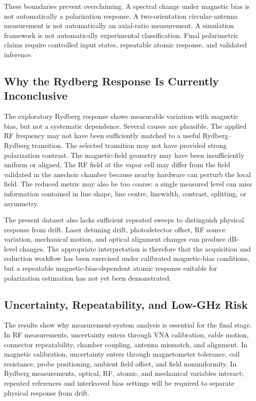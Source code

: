 \documentclass{ieeeaccess}
\begin{document}
These boundaries prevent overclaiming. A spectral change under magnetic bias is not automatically a polarization response. A two-orientation circular-antenna measurement is not automatically an axial-ratio measurement. A simulation framework is not automatically experimental classification. Final polarimetric claims require controlled input states, repeatable atomic response, and validated inference.

\subsection{Why the Rydberg Response Is Currently Inconclusive}
\label{subsec:discussion_rydberg_inconclusive}

The exploratory Rydberg response shows measurable variation with magnetic bias, but not a systematic dependence. Several causes are plausible. The applied RF frequency may not have been sufficiently matched to a useful Rydberg--Rydberg transition. The selected transition may not have provided strong polarization contrast. The magnetic-field geometry may have been insufficiently uniform or aligned. The RF field at the vapor cell may differ from the field validated in the anechoic chamber because nearby hardware can perturb the local field. The reduced metric may also be too coarse: a single measured level can miss information contained in line shape, line centre, linewidth, contrast, splitting, or asymmetry.

The present dataset also lacks sufficient repeated sweeps to distinguish physical response from drift. Laser detuning drift, photodetector offset, RF source variation, mechanical motion, and optical alignment changes can produce dB-level changes. The appropriate interpretation is therefore that the acquisition and reduction workflow has been exercised under calibrated magnetic-bias conditions, but a repeatable magnetic-bias-dependent atomic response suitable for polarization estimation has not yet been demonstrated.

\subsection{Uncertainty, Repeatability, and Low-GHz Risk}
\label{subsec:discussion_uncertainty_lowghz}

The results show why measurement-system analysis is essential for the final stage. In RF measurements, uncertainty enters through VNA calibration, cable motion, connector repeatability, chamber coupling, antenna mismatch, and alignment. In magnetic calibration, uncertainty enters through magnetometer tolerance, coil resistance, probe positioning, ambient field offset, and field nonuniformity. In Rydberg measurements, optical, RF, atomic, and mechanical variables interact; repeated references and interleaved bias settings will be required to separate physical response from drift.
\end{document}
